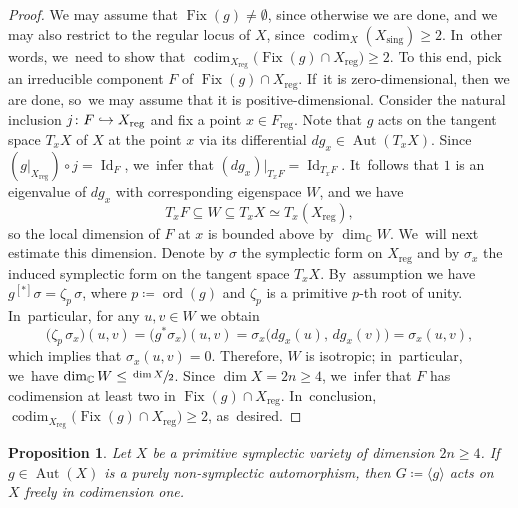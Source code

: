 \documentclass[10pt]{amsart}
\newcommand\hto{\mathrel{\lhook\joinrel\to}}
\theoremstyle{plain}
\newtheorem{prop}[thm]{Proposition}
\theoremstyle{definition}
\newcommand{\C}{\mathbb{C}}
\DeclareMathOperator{\codim}{codim}
\DeclareMathOperator{\Id}{Id}
\DeclareMathOperator{\Aut}{Aut}
\DeclareMathOperator{\Fix}{Fix}
\DeclareMathOperator{\ord}{ord}
\begin{document}
\begin{proof}
We may assume that $\Fix(g) \neq \emptyset$, since otherwise we are done, and we may also restrict to the regular locus of $X$, since $\codim_X (X_\text{sing}) \geq 2$. In~other words, we~need to show that $\codim_{X_\text{reg}} \bigl(\Fix(g) \cap X_{\text{reg}} \bigr) \geq 2$.
To this end, pick an irreducible component $F$ of $\Fix(g) \cap X_{\text{reg}}$. If~it is zero-dimensional, then we are done, so~we may assume that it is positive-dimensional. Consider the natural inclusion \hbox{$j \colon F \hto X_\text{reg}$} and fix a point $x \in F_\text{reg}$.
Note that $g$ acts on the tangent space $T_x X$ of $X$ at the point $x$ via its differential $dg_x \in \Aut(T_x X)$.
Since $(g |_{X_\text{reg}}) \circ j = \Id_{F}$, we~infer that $(dg_x) |_{T_x F} = \Id_{T_x F}$. It~follows that $1$ is an eigenvalue of $dg_x$ with corresponding eigenspace $W$, and we have
\[
T_x F \subseteq W \subseteq T_x X \simeq T_x (X_\text{reg}),
\]
so the local dimension of $F$ at $x$ is bounded above by $\dim_\C W$. We~will next estimate this dimension.
Denote by $\sigma$ the symplectic form on $X_{\text{reg}}$ and by $\sigma_x$ the induced symplectic form on the tangent space $T_x X$. By~assumption we have $g^{[*]} \sigma = \zeta_p \,\sigma$, where $p \coloneqq \ord(g)$ and $\zeta_p$ is a primitive $p$-th root of unity. In~particular, for any $u,v \in W$ we obtain
\[
\bigl(\zeta_p \,\sigma_x \bigr) (u,v) = \bigl(g^* \sigma_x \bigr) (u,v) = \sigma_x \bigl(dg_x(u), \,dg_x(v) \bigr) = \sigma_x(u,v),
\]
which implies that $\sigma_x(u,v)=0$. Therefore, $W$ is isotropic; in~particular, we~have
$ \dim_\C W \leq \sfrac{\dim X}{2} $. Since $\dim X = 2n \geq 4$, we~infer that $F$ has codimension at least two in $\Fix(g) \cap X_{\text{reg}}$. In~conclusion,
$ \codim_{X_\text{reg}} \bigl(\Fix(g) \cap X_{\text{reg}} \bigr) \geq 2 $, as~desired.
\end{proof}

\begin{prop}
\label{prop:group_acting_nonsymplectically_free_codim_one}
Let $X$ be a primitive symplectic variety of dimension $2n \geq 4$. If~$g \in \Aut(X)$ is a purely non-symplectic automorphism, then $G \coloneqq \langle g \rangle$ acts on~$X$ freely in codimension one.
\end{prop}
\end{document}

